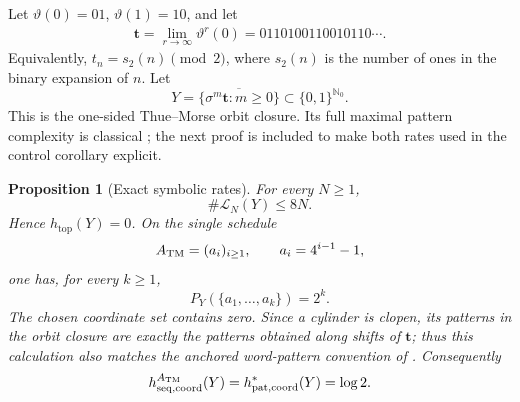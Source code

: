\documentclass[11pt,reqno]{amsart}
\numberwithin{equation}{section}
\newtheorem{proposition}[theorem]{Proposition}
\theoremstyle{definition}
\newcommand{\Nzero}{\mathbb N_0}
\newcommand{\Lcal}{\mathcal L}
\newcommand{\htop}{h_{\mathrm{top}}}
\begin{document}
Let $\vartheta(0)=01$, $\vartheta(1)=10$, and let
\begin{align*}
 \mathbf t=\lim_{r\to\infty}\vartheta^r(0)
 =0110100110010110\cdots.
\end{align*}
Equivalently, $t_n=s_2(n)\pmod2$, where $s_2(n)$ is the number of ones in
the binary expansion of $n$.  Let
\begin{equation}\label{eq:thue-morse-shift}
 Y=\overline{\{\sigma^m\mathbf t:m\ge0\}}
 \subset\{0,1\}^{\Nzero}.
\end{equation}
This is the one-sided Thue--Morse orbit closure.  Its full maximal pattern
complexity is classical \cite{KamaeZamboniWords2002,KamaeZamboniSystems2002}; the next
proof is included to make both rates used in the control corollary explicit.

\begin{proposition}[Exact symbolic rates]\label{prop:thue-morse}
For every $N\ge1$,
\begin{equation}\label{eq:TM-linear}
 \#\Lcal_N(Y)\le8N.
\end{equation}
Hence $\htop(Y)=0$.  On the single schedule
\begin{equation}\label{eq:TM-schedule}
 A_{\rm TM}=(a_i)_{i\ge1},
 \qquad a_i=4^{i-1}-1,
\end{equation}
one has, for every $k\ge1$,
\begin{equation}\label{eq:TM-full-pattern}
 P_Y(\{a_1,\ldots,a_k\})=2^k.
\end{equation}
The chosen coordinate set contains zero.  Since a cylinder is clopen, its
patterns in the orbit closure are exactly the patterns obtained along shifts
of $\mathbf t$; thus this calculation also matches the anchored word-pattern
convention of \cite{KamaeZamboniWords2002}.  Consequently
\begin{equation}\label{eq:TM-complexities}
 h_{\rm seq,coord}^{A_{\rm TM}}(Y)
 =h_{\rm pat,coord}^*(Y)=\log2.
\end{equation}
\end{proposition}
\end{document}
